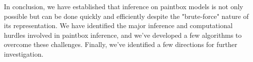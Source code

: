 \documentclass{article}
\begin{document}
In conclusion, we have established that inference on paintbox models is not only  possible but can be done quickly and efficiently despite the "brute-force" nature of its representation.  We have identified the major inference and computational hurdles involved in paintbox inference, and we've developed a few algorithms to overcome these challenges.  Finally, we've identified a few directions for further investigation.     



\end{document}
